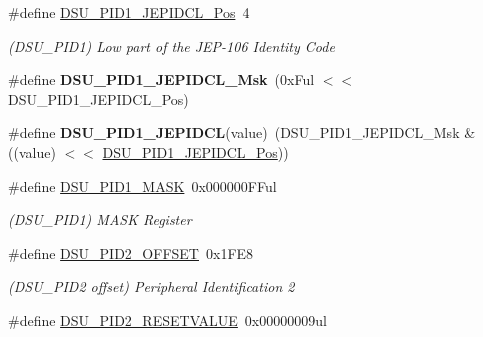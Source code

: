\begin{DoxyCompactItemize}
\item 
\hypertarget{group___s_a_m_l21___d_s_u_ga64528557ce517ad0117a1416e03e0be9}{}\#define \hyperlink{group___s_a_m_l21___d_s_u_ga64528557ce517ad0117a1416e03e0be9}{D\+S\+U\+\_\+\+P\+I\+D1\+\_\+\+J\+E\+P\+I\+D\+C\+L\+\_\+\+Pos}~4\label{group___s_a_m_l21___d_s_u_ga64528557ce517ad0117a1416e03e0be9}

\begin{DoxyCompactList}\small\item\em (D\+S\+U\+\_\+\+P\+I\+D1) Low part of the J\+E\+P-\/106 Identity Code \end{DoxyCompactList}\item 
\hypertarget{group___s_a_m_l21___d_s_u_gaf45a07f7bcaedb965d705f1575f1438f}{}\#define {\bfseries D\+S\+U\+\_\+\+P\+I\+D1\+\_\+\+J\+E\+P\+I\+D\+C\+L\+\_\+\+Msk}~(0x\+Ful $<$$<$ D\+S\+U\+\_\+\+P\+I\+D1\+\_\+\+J\+E\+P\+I\+D\+C\+L\+\_\+\+Pos)\label{group___s_a_m_l21___d_s_u_gaf45a07f7bcaedb965d705f1575f1438f}

\item 
\hypertarget{group___s_a_m_l21___d_s_u_gaea602fc378fd5fb10111e3d8e9022cf3}{}\#define {\bfseries D\+S\+U\+\_\+\+P\+I\+D1\+\_\+\+J\+E\+P\+I\+D\+C\+L}(value)~(D\+S\+U\+\_\+\+P\+I\+D1\+\_\+\+J\+E\+P\+I\+D\+C\+L\+\_\+\+Msk \& ((value) $<$$<$ \hyperlink{group___s_a_m_l21___d_s_u_ga64528557ce517ad0117a1416e03e0be9}{D\+S\+U\+\_\+\+P\+I\+D1\+\_\+\+J\+E\+P\+I\+D\+C\+L\+\_\+\+Pos}))\label{group___s_a_m_l21___d_s_u_gaea602fc378fd5fb10111e3d8e9022cf3}

\item 
\hypertarget{group___s_a_m_l21___d_s_u_ga2398899995a62f2a20b4390051c5d269}{}\#define \hyperlink{group___s_a_m_l21___d_s_u_ga2398899995a62f2a20b4390051c5d269}{D\+S\+U\+\_\+\+P\+I\+D1\+\_\+\+M\+A\+S\+K}~0x000000\+F\+Ful\label{group___s_a_m_l21___d_s_u_ga2398899995a62f2a20b4390051c5d269}

\begin{DoxyCompactList}\small\item\em (D\+S\+U\+\_\+\+P\+I\+D1) M\+A\+S\+K Register \end{DoxyCompactList}\item 
\hypertarget{group___s_a_m_l21___d_s_u_gae848d742529a04e4fc64065f2bfde2d7}{}\#define \hyperlink{group___s_a_m_l21___d_s_u_gae848d742529a04e4fc64065f2bfde2d7}{D\+S\+U\+\_\+\+P\+I\+D2\+\_\+\+O\+F\+F\+S\+E\+T}~0x1\+F\+E8\label{group___s_a_m_l21___d_s_u_gae848d742529a04e4fc64065f2bfde2d7}

\begin{DoxyCompactList}\small\item\em (D\+S\+U\+\_\+\+P\+I\+D2 offset) Peripheral Identification 2 \end{DoxyCompactList}\item 
\hypertarget{group___s_a_m_l21___d_s_u_ga34f08ebf29928fc5c95f018abbc6d3a3}{}\#define \hyperlink{group___s_a_m_l21___d_s_u_ga34f08ebf29928fc5c95f018abbc6d3a3}{D\+S\+U\+\_\+\+P\+I\+D2\+\_\+\+R\+E\+S\+E\+T\+V\+A\+L\+U\+E}~0x00000009ul\label{group___s_a_m_l21___d_s_u_ga34f08ebf29928fc5c95f018abbc6d3a3}


\end{DoxyCompactItemize}
